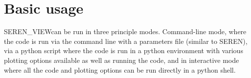 \documentclass[a4paper]{article}
\newcommand{\CODENAME}{SEREN\_VIEW}
\newcommand{\var}[1]{\texttt{#1}}
\begin{document}
\begin{itemize}





\end{itemize}








\newpage


\section{Basic usage}
\CODENAME can be run in three principle modes.  Command-line mode, where the code is run via the command line with a parameters file (similar to SEREN), via a python script where the code is run in a python environment with various plotting options available as well as running the code, and in interactive mode where all the code and plotting options can be run directly in a python shell.
\end{document}
